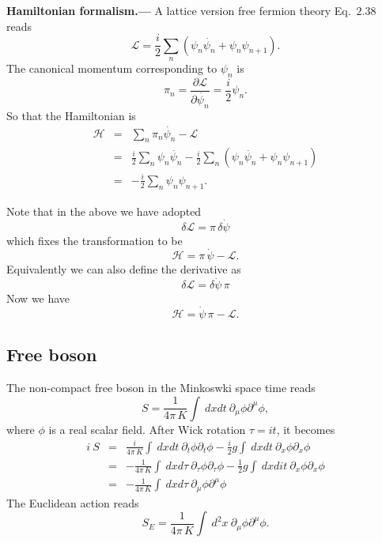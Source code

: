 \documentclass[submission, PhysLectNotes]{SciPost}
\begin{document}
{\bf Hamiltonian formalism.---}
A lattice version free fermion theory Eq.~$2.38$ reads
\begin{equation}
    \mathcal{L} = \frac{i}{2} \sum_n \left( \psi_n \dot{\psi_n} + \psi_n \psi_{n+1}\right).
\end{equation}
The canonical momentum corresponding to $\psi_n$ is
\begin{equation}
    \pi_n = \frac{\partial \mathcal{L}}{\partial \dot{\psi_n}} = \frac{i}{2}\psi_n.
\end{equation}
So that the Hamiltonian is
\begin{eqnarray}
    \mathcal{H} &=& \sum_n \pi_n \dot{\psi_n} - \mathcal{L} \nonumber\\
      &=& \frac{i}{2}\sum_n\psi_n \dot{\psi_n} - \frac{i}{2} \sum_n \left( \psi_n \dot{\psi_n} + \psi_n \psi_{n+1}\right) \\
      &=& - \frac{i}{2} \sum_n \psi_n \psi_{n+1} \nonumber.
\end{eqnarray}

Note that in the above we have adopted
\begin{equation}
	\delta \mathcal{L} = \pi\,\delta \dot{\psi}
\end{equation}
which fixes the transformation to be 
\begin{equation}
	\mathcal{H} = \pi \,\dot{\psi} - \mathcal{L}.
\end{equation}
Equivalently we can also define the derivative as
\begin{equation}
	\delta \mathcal{L} = \delta \dot{\psi} \,\pi
\end{equation}
Now we have 
\begin{equation}
	\mathcal{H} = \dot{\psi} \, \pi - \mathcal{L}.
\end{equation}


\subsection{Free boson}
The non-compact free boson in the Minkoswki space time reads
\begin{equation}
    S = \frac{1}{4\pi\,K}\int \ dxdt \ \partial_\mu \phi \partial^\mu \phi,
\end{equation}
where $\phi$ is a real scalar field. After Wick rotation $\tau = it$, it becomes
\begin{eqnarray}
    i\ S &=& \frac{i}{4\pi\,K}\int \ dxdt \ \partial_t \phi \partial_t \phi - \frac{i}{2}g\int \ dxdt \ \partial_x \phi \partial_x \phi \nonumber \\
    &=& -\frac{1}{4\pi\,K}\int \ dxd\tau \ \partial_\tau \phi \partial_\tau \phi - \frac{1}{2}g\int \ dxdit \ \partial_x \phi \partial_x \phi \nonumber \\
    &=& -\frac{1}{4\pi\,K}\int \ dxd\tau \ \partial_\mu \phi \partial^\mu \phi
\end{eqnarray}
The Euclidean action reads
\begin{equation}
    S_E = \frac{1}{4\pi\,K}\int \ d^2x \ \partial_\mu \phi \partial^\mu \phi.
\end{equation}
\end{document}
